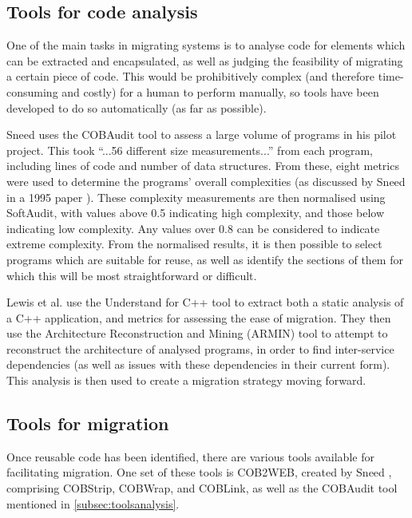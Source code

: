 \documentclass[12pt,journal,compsoc]{IEEEtran}
\begin{document}
\subsection{Tools for code analysis}
\label{subsec:toolsanalysis}
One of the main tasks in migrating systems is to analyse code for elements which can be extracted and encapsulated, as well as judging the feasibility of migrating a certain piece of code. This would be prohibitively complex (and therefore time-consuming and costly) for a human to perform manually, so tools have been developed to do so automatically (as far as possible).

Sneed \cite{Sneed2009} uses the COBAudit tool to assess a large volume of programs in his pilot project. This took ``...56 different size measurements...'' \cite{Sneed2009} from each program, including lines of code and number of data structures. From these, eight metrics were used to determine the programs' overall complexities (as discussed by Sneed in a 1995 paper \cite{Sneed1995}). These complexity measurements are then normalised using SoftAudit, with values above 0.5 indicating high complexity, and those below indicating low complexity. Any values over 0.8 can be considered to indicate extreme complexity. From the normalised results, it is then possible to select programs which are suitable for reuse, as well as identify the sections of them for which this will be most straightforward or difficult.

Lewis et al. \cite{Lewis2005a} use the Understand for C++ tool to extract both a static analysis of a C++ application, and metrics for assessing the ease of migration. They then use the Architecture Reconstruction and Mining (ARMIN) \cite{O'Brien2005} tool to attempt to reconstruct the architecture of analysed programs, in order to find inter-service dependencies (as well as issues with these dependencies in their current form). This analysis is then used to create a migration strategy moving forward.

\subsection{Tools for migration}
\label{subsec:toolsmigration}
Once reusable code has been identified, there are various tools available for facilitating migration. One set of these tools is COB2WEB, created by Sneed \cite{Sneed2008}, comprising COBStrip, COBWrap, and COBLink, as well as the COBAudit tool mentioned in \autoref{subsec:toolsanalysis}.
\end{document}
